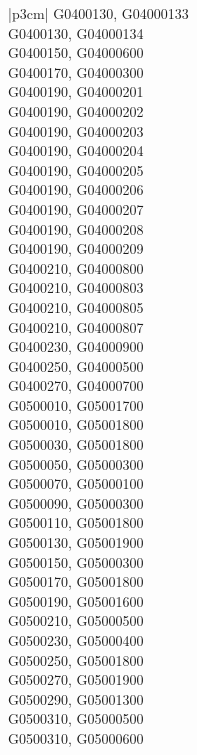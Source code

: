 \begin{customLongTable}{ |p{3cm}| }
G0400130, G04000133 \\ \hline
G0400130, G04000134 \\ \hline
G0400150, G04000600 \\ \hline
G0400170, G04000300 \\ \hline
G0400190, G04000201 \\ \hline
G0400190, G04000202 \\ \hline
G0400190, G04000203 \\ \hline
G0400190, G04000204 \\ \hline
G0400190, G04000205 \\ \hline
G0400190, G04000206 \\ \hline
G0400190, G04000207 \\ \hline
G0400190, G04000208 \\ \hline
G0400190, G04000209 \\ \hline
G0400210, G04000800 \\ \hline
G0400210, G04000803 \\ \hline
G0400210, G04000805 \\ \hline
G0400210, G04000807 \\ \hline
G0400230, G04000900 \\ \hline
G0400250, G04000500 \\ \hline
G0400270, G04000700 \\ \hline
G0500010, G05001700 \\ \hline
G0500010, G05001800 \\ \hline
G0500030, G05001800 \\ \hline
G0500050, G05000300 \\ \hline
G0500070, G05000100 \\ \hline
G0500090, G05000300 \\ \hline
G0500110, G05001800 \\ \hline
G0500130, G05001900 \\ \hline
G0500150, G05000300 \\ \hline
G0500170, G05001800 \\ \hline
G0500190, G05001600 \\ \hline
G0500210, G05000500 \\ \hline
G0500230, G05000400 \\ \hline
G0500250, G05001800 \\ \hline
G0500270, G05001900 \\ \hline
G0500290, G05001300 \\ \hline
G0500310, G05000500 \\ \hline
G0500310, G05000600 \\ \hline

\end{customLongTable}

